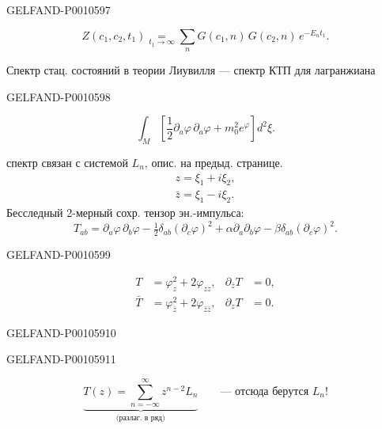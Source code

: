 \begin{GelfandAdjacentEvidence}{GELFAND-P001059}{7}

\begin{equation*}
Z(c_1,c_2,t_1)\underset{t_1\to\infty}{=}
  \sum_nG(c_1,n)\,G(c_2,n)\,e^{-E_nt_1}.
\tag{5}
\end{equation*}

Спектр стац. состояний в теории Лиувилля — спектр КТП для лагранжиана
\end{GelfandAdjacentEvidence}
\begin{GelfandAdjacentEvidence}{GELFAND-P001059}{8}

\begin{equation*}
\int_M\left[\frac12\partial_a\varphi\,\partial_a\varphi+
  m_0^2e^\varphi\right]d^2\xi.
\tag{6}
\end{equation*}

 спектр связан с системой \(L_n\), опис. на предыд. странице.
\begin{gather*}
z=\xi_1+i\xi_2,\\
\bar z=\xi_1-i\xi_2.
\end{gather*}
Бесследный 2-мерный сохр. тензор эн.-импульса:
\[
T_{ab}=\partial_a\varphi\,\partial_b\varphi
   -\tfrac12\delta_{ab}(\partial_c\varphi)^2
   +\alpha\partial_a\partial_b\varphi-\beta\delta_{ab}(\partial_c\varphi)^2.
\]
\end{GelfandAdjacentEvidence}
\begin{GelfandAdjacentEvidence}{GELFAND-P001059}{9}

\begin{align*}
T&=\varphi_z^2+2\varphi_{zz},&
\partial_{\bar z}T&=0,\\
\bar T&=\varphi_{\bar z}^2+2\varphi_{\bar z\bar z},&
\partial_zT&=0.
\end{align*}
\end{GelfandAdjacentEvidence}
\begin{GelfandAdjacentEvidence}{GELFAND-P001059}{10}

\end{GelfandAdjacentEvidence}
\begin{GelfandAdjacentEvidence}{GELFAND-P001059}{11}


\[
\underbrace{T(z)=\sum_{n=-\infty}^{\infty}z^{n-2}L_n}_{\text{(разлаг. в ряд)}}
\qquad\text{— отсюда берутся }L_n!
\]
\end{GelfandAdjacentEvidence}



